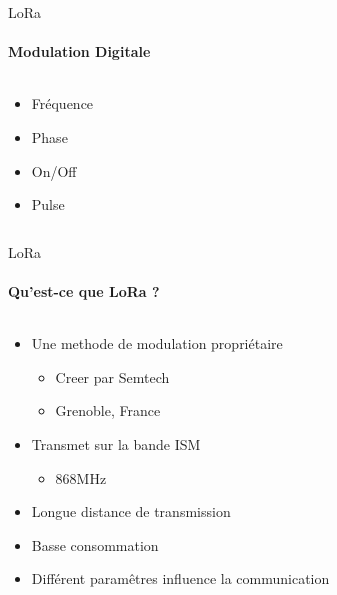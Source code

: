 \begin{frame}{LoRa}
\framesubtitle{Modulation Digitale}

\begin{columns}
\begin{column}{0.5\textwidth}
\begin{itemize}
  \item Fréquence
  \item Phase
  \item On/Off
  \item Pulse
\end{itemize}  
\end{column}
\begin{column}{0.5\textwidth}

\end{column}
\end{columns}
\end{frame}

\begin{frame}{LoRa}
\framesubtitle{Qu'est-ce que LoRa ?}
\begin{columns}
  \begin{column}{0.6\textwidth}
    
  \begin{itemize}
    \item Une methode de modulation propriétaire
    \begin{itemize}
      \item Creer par Semtech
      \item Grenoble, France
    \end{itemize}
    \item Transmet sur la bande ISM
    \begin{itemize}
      \item 868MHz
    \end{itemize}
    \item Longue distance de transmission
    \item Basse consommation
    \item Différent paramêtres influence la communication
  \end{itemize}
  \end{column}
  \begin{column}{0.4\textwidth}
  \end{column}
\end{columns}
\end{frame}

